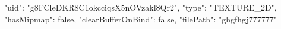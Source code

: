 {
    "uid": "g8FCleDKR8C1okcciqsX5nOVzakl8Qr2",
    "type": "TEXTURE_2D",
    "hasMipmap": false,
    "clearBufferOnBind": false,
    "filePath": "ghgfhgj777777"
}